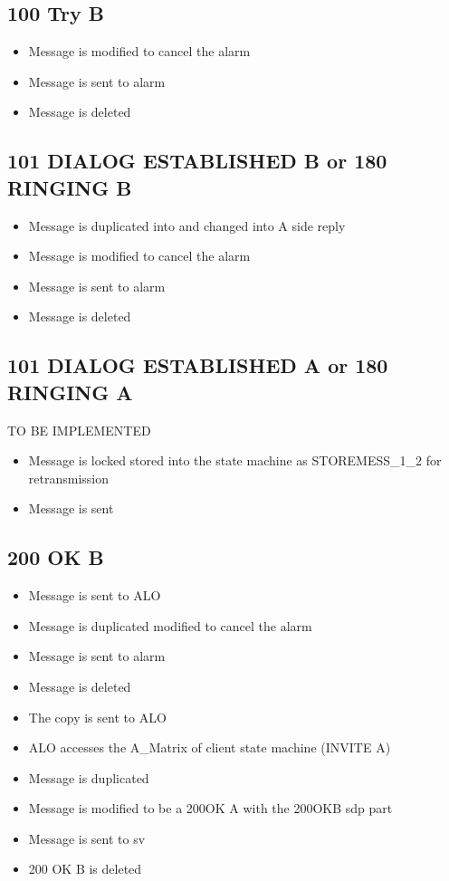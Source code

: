 \documentclass[a4paper]{article}
\begin{document}
\subsection{100 Try B}
\begin {itemize}
\item Message is modified to cancel the alarm
\item Message is sent to alarm
\item Message is deleted
\end{itemize}

\subsection{101 DIALOG ESTABLISHED B or 180 RINGING B}
\begin {itemize}
\item Message is duplicated into and changed into A side reply
\item Message is modified to cancel the alarm
\item Message is sent to alarm
\item Message is deleted
\end{itemize}

\subsection{101 DIALOG ESTABLISHED A or 180 RINGING A}
TO BE IMPLEMENTED
\begin {itemize}
\item Message is locked stored into the state machine as STOREMESS\_1\_2 for retransmission 
\item Message is sent
\end{itemize}

\subsection{200 OK B}
\begin {itemize}
\item Message is sent to ALO
\item Message is duplicated modified to cancel the alarm
\item Message is sent to alarm
\item Message is deleted
\item The copy is sent to ALO
\item ALO accesses the A\_Matrix of client state machine (INVITE A)
\item Message is duplicated
\item Message is modified to be a 200OK A with the 200OKB sdp part
\item Message is sent to sv
\item 200 OK B is deleted
\end{itemize}
\end{document}
